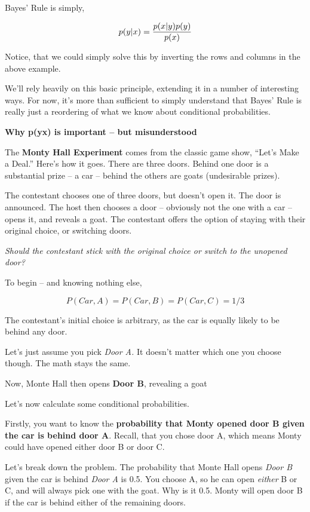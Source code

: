\documentclass[
]{book}
\begin{document}
Bayes' Rule is simply,

\[p(y|x) ={p(x|y) p(y)\over p(x)}\]

Notice, that we could simply solve this by inverting the rows and columns in the above example.

We'll rely heavily on this basic principle, extending it in a number of interesting ways. For now, it's more than sufficient to simply understand that Bayes' Rule is really just a reordering of what we know about conditional probabilities.

\textbf{Why p(y\textbar x) is important -- but misunderstood}

The \textbf{Monty Hall Experiment} comes from the classic game show, ``Let's Make a Deal.'' Here's how it goes. There are three doors. Behind one door is a substantial prize -- a car -- behind the others are goats (undesirable prizes).

The contestant chooses one of three doors, but doesn't open it. The door is announced. The host then chooses a door -- obviously not the one with a car -- opens it, and reveals a goat. The contestant offers the option of staying with their original choice, or switching doors.

\emph{Should the contestant stick with the original choice or switch to the unopened door?}

To begin -- and knowing nothing else,

\[ P(Car, A) = P(Car, B) = P(Car, C)=1/3\]

The contestant's initial choice is arbitrary, as the car is equally likely to be behind any door.

Let's just assume you pick \emph{Door A.} It doesn't matter which one you choose though. The math stays the same.

Now, Monte Hall then opens \textbf{Door B}, revealing a goat

Let's now calculate some conditional probabilities.

Firstly, you want to know the \textbf{probability that Monty opened door B given the car is behind door A}. Recall, that you chose door A, which means Monty could have opened either door B or door C.

Let's break down the problem. The probability that Monte Hall opens \emph{Door B} given the car is behind \emph{Door A} is 0.5. You choose A, so he can open \emph{either} B or C, and will always pick one with the goat. Why is it 0.5. Monty will open door B if the car is behind either of the remaining doors.
\end{document}

